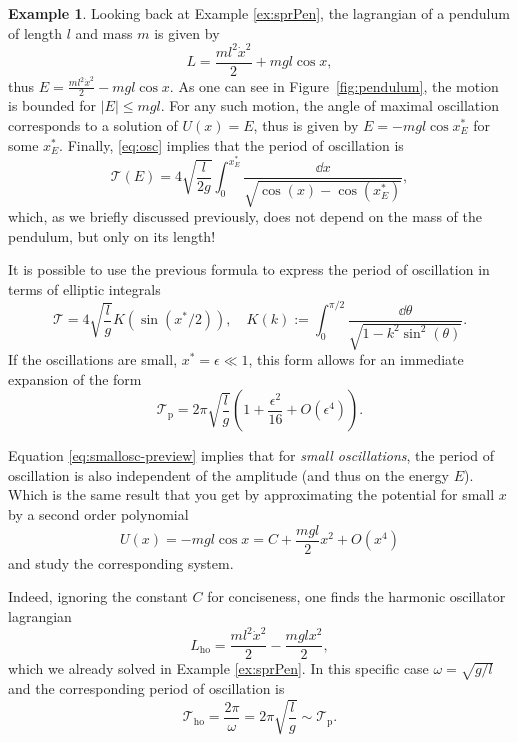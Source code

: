 \documentclass[english,fontsize=11pt,paper=b5]{scrbook}
\theoremstyle{definition}
\newtheorem{example}{Example}[chapter]
\begin{document}
    \begin{example}\label{ex:small-osc}
      Looking back at Example \ref{ex:sprPen}, the lagrangian of a pendulum of length $l$ and mass $m$ is given by
      \begin{equation}
        L = \frac{ml^2 \dot x^2}2 + mgl \cos x,
      \end{equation}
      thus $E = \frac{ml^2 \dot x^2}2 - mgl \cos x$.
      As one can see in Figure~\ref{fig:pendulum}, the motion is bounded for $|E| \leq mgl$. For any such motion, the angle of maximal oscillation corresponds to a solution of $U(x) = E$, thus is given by $E = -mgl \cos x^*_E$ for some $x^*_E$.
      Finally, \eqref{eq:osc} implies that the period of oscillation is
      \begin{equation}
        \mathcal{T}(E) = 4 \sqrt{\frac l{2g}} \int_0^{x^*_E} \frac{\dd x}{\sqrt{\cos(x) - \cos(x^*_E)}},
      \end{equation}
      which, as we briefly discussed previously, does not depend on the mass of the pendulum, but only on its length!

      It is possible to use the previous formula to express the period of oscillation in terms of elliptic integrals
      \begin{equation}
        \mathcal{T} = 4 \sqrt{\frac lg} K\left (\sin(x^*/2)\right), \quad
        K(k):= \int_0^{\pi/2} \frac{\dd \theta}{\sqrt{1 - k^2\sin^2(\theta)}}.
      \end{equation}
      If the oscillations are small, $x^* = \epsilon \ll 1$, this form allows for an immediate expansion of the form
      \begin{equation}\label{eq:smallosc-preview}
        \mathcal{T}_\mathrm{p} = 2\pi \sqrt{\frac lg} \left(1 + \frac{\epsilon^2}{16} + O(\epsilon^4)\right).
      \end{equation}

      Equation \eqref{eq:smallosc-preview} implies that for \emph{small oscillations}, the period of oscillation is also independent of the amplitude (and thus on the energy $E$). Which is the same result that you get by approximating the potential for small $x$ by a second order polynomial
      \begin{equation}
        U(x) = -mgl \cos x = C + \frac{mgl}2 x^2 + O(x^4)
      \end{equation}
      and study the corresponding system.

      Indeed, ignoring the constant $C$ for conciseness, one finds the harmonic oscillator lagrangian
      \begin{equation}
        L_{\mathrm{ho}} = \frac{ml^2 \dot x^2}{2} - \frac{mgl x^2}{2},
      \end{equation}
      which we already solved in Example \ref{ex:sprPen}.
      In this specific case $\omega = \sqrt{g/l}$ and the corresponding period of oscillation is
      \begin{equation}
        \mathcal{T}_{\mathrm{ho}} = \frac{2\pi}\omega = 2\pi \sqrt{\frac lg} \sim \mathcal{T}_\mathrm{p}.
      \end{equation}


\end{example}
\end{document}
